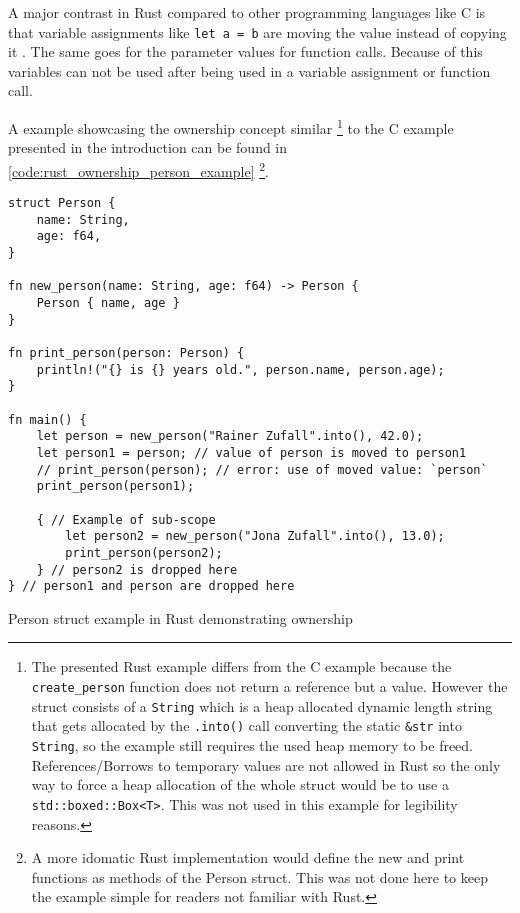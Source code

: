 A major contrast in Rust compared to other programming languages like C
is that variable assignments like \texttt{let a = b} are moving the value
instead of copying it \cite[2.2 Ownership]{rust_borrow_formalism_2021}. The same goes for the parameter values for function calls.
Because of this variables can not be used after being used in a variable assignment or function call.

A example showcasing the ownership concept similar
\footnote{
    The presented Rust example differs from the C example because the
    \texttt{create\_person} function does not return a reference but a value.
    However the struct consists of a \texttt{String} which is a heap allocated
    dynamic length string that gets allocated by the \texttt{.into()} call
    converting the static \texttt{\&str} into \texttt{String}, so 
    the example still requires the used heap memory to be freed.
    References/Borrows to temporary values are not allowed in Rust so
    the only way to force a heap allocation of the whole struct would
    be to use a \texttt{std::boxed::Box<T>}. This was not used in this
    example for legibility reasons.
}
to the C example presented in the introduction
can be found in \autoref{code:rust_ownership_person_example}
\footnote{
    A more idomatic Rust implementation would define the new and print functions as methods of the Person struct.
    This was not done here to keep the example simple for readers not familiar with Rust.
}.

\begin{listing}[H] 
    \begin{verbatim}
struct Person {
    name: String,
    age: f64,
}

fn new_person(name: String, age: f64) -> Person {
    Person { name, age }
}

fn print_person(person: Person) {
    println!("{} is {} years old.", person.name, person.age);
}

fn main() {
    let person = new_person("Rainer Zufall".into(), 42.0);
    let person1 = person; // value of person is moved to person1
    // print_person(person); // error: use of moved value: `person`
    print_person(person1);

    { // Example of sub-scope
        let person2 = new_person("Jona Zufall".into(), 13.0);
        print_person(person2);
    } // person2 is dropped here
} // person1 and person are dropped here
    \end{verbatim}
    \caption{Person struct example in Rust demonstrating ownership}
    \label{code:rust_ownership_person_example}
\end{listing}

